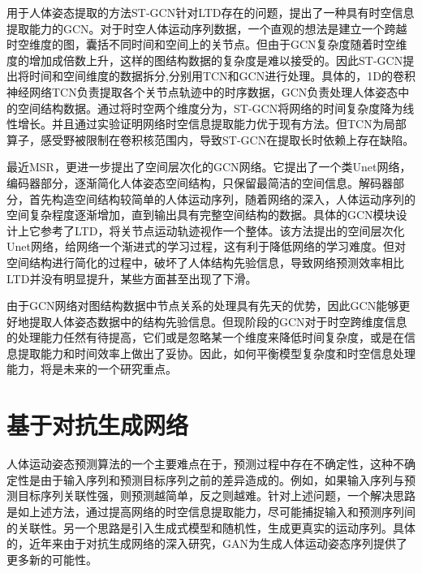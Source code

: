 用于人体姿态提取的方法ST-GCN\parencite{yan2018spatial}针对LTD存在的问题，提出了一种具有时空信息提取能力的GCN。对于时空人体运动序列数据，一个直观的想法是建立一个跨越时空维度的图，囊括不同时间和空间上的关节点。但由于GCN复杂度随着时空维度的增加成倍数上升，这样的图结构数据的复杂度是难以接受的。因此ST-GCN提出将时间和空间维度的数据拆分,分别用TCN\parencite{oord2016wavenet}和GCN进行处理。具体的，1D的卷积神经网络TCN负责提取各个关节点轨迹中的时序数据，GCN负责处理人体姿态中的空间结构数据。通过将时空两个维度分为，ST-GCN将网络的时间复杂度降为线性增长。并且通过实验证明网络时空信息提取能力优于现有方法。但TCN为局部算子，感受野被限制在卷积核范围内，导致ST-GCN在提取长时依赖上存在缺陷。

最近MSR\parencite{dang2021msr}，更进一步提出了空间层次化的GCN网络。它提出了一个类Unet\parencite{ronneberger2015u}网络，编码器部分，逐渐简化人体姿态空间结构，只保留最简洁的空间信息。解码器部分，首先构造空间结构较简单的人体运动序列，随着网络的深入，人体运动序列的空间复杂程度逐渐增加，直到输出具有完整空间结构的数据。具体的GCN模块设计上它参考了LTD，将关节点运动轨迹视作一个整体。该方法提出的空间层次化Unet网络，给网络一个渐进式的学习过程，这有利于降低网络的学习难度。但对空间结构进行简化的过程中，破坏了人体结构先验信息，导致网络预测效率相比LTD并没有明显提升，某些方面甚至出现了下滑。

由于GCN网络对图结构数据中节点关系的处理具有先天的优势，因此GCN能够更好地提取人体姿态数据中的结构先验信息。但现阶段的GCN对于时空跨维度信息的处理能力任然有待提高，它们或是忽略某一个维度来降低时间复杂度，或是在信息提取能力和时间效率上做出了妥协。因此，如何平衡模型复杂度和时空信息处理能力，将是未来的一个研究重点。

\section{基于对抗生成网络}
人体运动姿态预测算法的一个主要难点在于，预测过程中存在不确定性，这种不确定性是由于输入序列和预测目标序列之前的差异造成的。例如，如果输入序列与预测目标序列关联性强，则预测越简单，反之则越难。针对上述问题，一个解决思路是如上述方法，通过提高网络的时空信息提取能力，尽可能捕捉输入和预测序列间的关联性。另一个思路是引入生成式模型和随机性，生成更真实的运动序列。具体的，近年来由于对抗生成网络\parencite{goodfellow2020generative}的深入研究，GAN为生成人体运动姿态序列提供了更多新的可能性。

